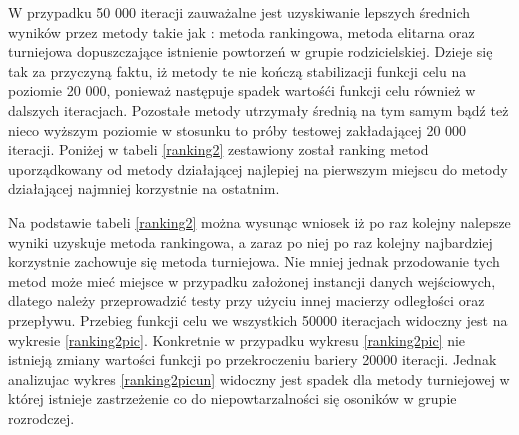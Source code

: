 W przypadku 50 000 iteracji zauważalne jest uzyskiwanie lepszych średnich wyników przez metody takie jak : metoda rankingowa, metoda elitarna oraz turniejowa dopuszczające istnienie powtorzeń w grupie rodzicielskiej. Dzieje się tak za przyczyną faktu, iż metody te nie kończą stabilizacji funkcji celu na poziomie 20 000, ponieważ następuje spadek wartośći funkcji celu również w dalszych iteracjach. Pozostałe metody utrzymały średnią na tym samym bądź też nieco wyższym poziomie w stosunku to próby testowej zakładającej 20 000 iteracji. Poniżej w tabeli \ref{ranking2} zestawiony został ranking metod uporządkowany od metody działającej najlepiej na pierwszym miejscu do metody działającej najmniej korzystnie na ostatnim.

\begin{table}[h!]
\begin{center}
\caption{Ranking metod selekcji na podstawie średniej wartości błędu względnego funkcji celu}
\label{ranking2}
\end{center}
\end{table}

Na podstawie tabeli \ref{ranking2} można wysunąc wniosek iż po raz kolejny nalepsze wyniki uzyskuje metoda rankingowa, a zaraz po niej po raz kolejny najbardziej korzystnie zachowuje się metoda turniejowa. Nie mniej jednak przodowanie tych metod może mieć miejsce w przypadku założonej instancji danych wejściowych, dlatego należy przeprowadzić testy przy użyciu innej macierzy odległości oraz  przepływu. Przebieg funkcji celu we wszystkich 50000 iteracjach widoczny jest na wykresie \ref{ranking2pic}. Konkretnie w przypadku wykresu \ref{ranking2pic} nie istnieją zmiany wartości funkcji po przekroczeniu bariery 20000 iteracji. Jednak analizujac wykres \ref{ranking2picun} widoczny jest spadek dla metody turniejowej w której istnieje zastrzeżenie co do niepowtarzalności się osoników w grupie rozrodczej.

